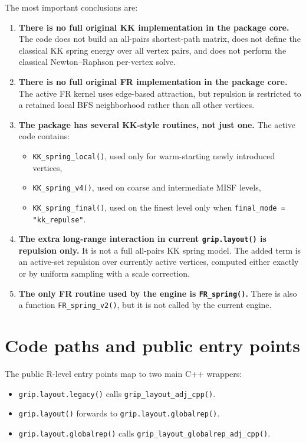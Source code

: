 \documentclass[11pt]{article}
\begin{document}
The most important conclusions are:
\begin{enumerate}[leftmargin=1.5em]
\item \textbf{There is no full original KK implementation in the package core.}
The code does not build an all-pairs shortest-path matrix, does not define the
classical KK spring energy over all vertex pairs, and does not perform the
classical Newton--Raphson per-vertex solve.

\item \textbf{There is no full original FR implementation in the package core.}
The active FR kernel uses edge-based attraction, but repulsion is restricted to
a retained local BFS neighborhood rather than all other vertices.

\item \textbf{The package has several KK-style routines, not just one.} The
active code contains:
  \begin{itemize}[leftmargin=1.5em]
  \item \texttt{KK\_spring\_local()}, used only for warm-starting newly introduced vertices,
  \item \texttt{KK\_spring\_v4()}, used on coarse and intermediate MISF levels,
  \item \texttt{KK\_spring\_final()}, used on the finest level only when
  \texttt{final\_mode = "kk\_repulse"}.
  \end{itemize}

\item \textbf{The extra long-range interaction in current \texttt{grip.layout()}
is repulsion only.} It is not a full all-pairs KK spring model. The added term
is an active-set repulsion over currently active vertices, computed either
exactly or by uniform sampling with a scale correction.

\item \textbf{The only FR routine used by the engine is \texttt{FR\_spring()}.}
There is also a function \texttt{FR\_spring\_v2()}, but it is not called by the
current engine.
\end{enumerate}

\section{Code paths and public entry points}

The public R-level entry points map to two main C++ wrappers:
\begin{itemize}[leftmargin=1.5em]
\item \texttt{grip.layout.legacy()} calls \texttt{grip\_layout\_adj\_cpp()}.
\item \texttt{grip.layout()} forwards to \texttt{grip.layout.globalrep()}.
\item \texttt{grip.layout.globalrep()} calls \texttt{grip\_layout\_globalrep\_adj\_cpp()}.
\end{itemize}
\end{document}
